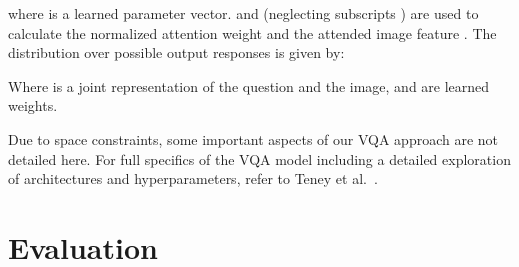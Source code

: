 \documentclass[10pt,twocolumn,letterpaper]{article}
\begin{document}
\noindent
where  is a learned parameter vector.  and  (neglecting subscripts ) are used to calculate the normalized attention weight and the attended image feature . The distribution over possible output responses  is given by:

Where  is a joint representation of the question and the image, and  are learned weights. 

Due to space constraints, some important aspects of our VQA approach are not detailed here. For full specifics of the VQA model including a detailed exploration of architectures and hyperparameters, refer to Teney et al.~\cite{teney2017tips}. 


\section{Evaluation}
\end{document}
